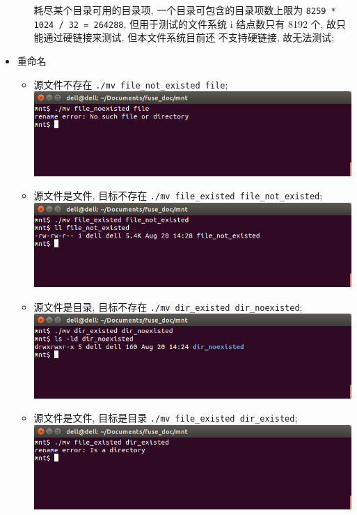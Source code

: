 \documentclass[nofonts]{ctexart}
\begin{document}
\begin{itemize}
\begin{itemize}
  耗尽某个目录可用的目录项, 一个目录可包含的目录项数上限为
  \texttt{8259 * 1024 / 32 = 264288}, 但用于测试的文件系统 i 结点数只有
  8192 个, 故只能通过硬链接来测试, 但本文件系统目前还 不支持硬链接,
  故无法测试;\\
\end{itemize}
\item
  重命名
\begin{itemize}
\item
  源文件不存在 \texttt{./mv file\_not\_existed file};\\
  \includegraphics[width=15cm]{./images/./mv_t1.png}
\item
  源文件是文件, 目标不存在
  \texttt{./mv file\_existed file\_not\_existed};\\
  \includegraphics[width=15cm]{./images/./mv_t2.png}
\item
  源文件是目录, 目标不存在 \texttt{./mv dir\_existed dir\_noexisted};\\
  \includegraphics[width=15cm]{./images/./mv_t3.png}
\item
  源文件是文件, 目标是目录 \texttt{./mv file\_existed dir\_existed};\\
  \includegraphics[width=15cm]{./images/./mv_t4.png}

\end{itemize}
\end{itemize}
\end{document}
